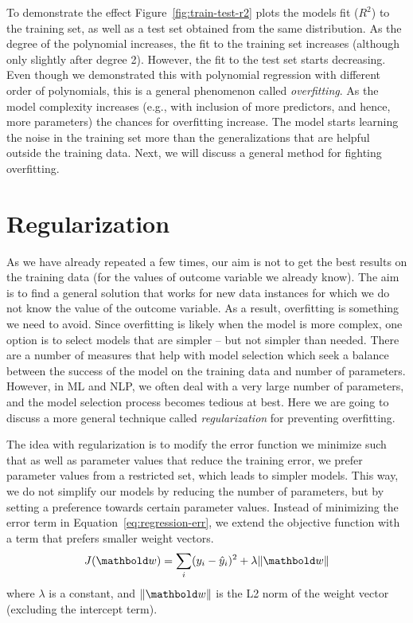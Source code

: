 To demonstrate the effect Figure~\ref{fig:train-test-r2} plots the
models fit ($R^{2}$) to the training set,
as well as a test set obtained from the same distribution.
As the degree of the polynomial increases,
the fit to the training set increases
(although only slightly after degree 2).
However, the fit to the test set starts decreasing.
Even though we demonstrated this with polynomial regression
with different order of polynomials,
this is a general phenomenon called \emph{overfitting}.
As the model complexity increases
(e.g., with inclusion of more predictors, and hence, more parameters)
the chances for overfitting increase.
The model starts learning the noise in the training set
more than the generalizations that are helpful outside the training data.
Next, we will discuss a general method for fighting overfitting.

\section{Regularization}

As we have already repeated a few times,
our aim is not to get the best results on the training data
(for the values of outcome variable we already know).
The aim is to find a general solution that works for new data instances
for which we do not know the value of the outcome variable.
As a result, overfitting is something we need to avoid.
Since overfitting is likely when the model is more complex,
one option is to select models that are simpler
-- but not simpler than needed.
There are a number of measures that help with model selection
which seek a balance between the success of the model on the training
data and number of parameters.%
However, in ML and NLP, we often deal with a very large number of parameters,
and the model selection process becomes tedious at best.
Here we are going to discuss a more general technique called
\emph{regularization} for preventing overfitting.

The idea with regularization is to modify the error function
we minimize such that
as well as parameter values that reduce the training error,
we prefer parameter values from a restricted set,
which leads to simpler models.
This way, we do not simplify our models by reducing the number of parameters,
but by setting a preference towards certain parameter values.
Instead of minimizing the error term in Equation~\ref{eq:regression-err},
we extend the objective function with a term that prefers
smaller weight vectors.
\begin{equation}\label{eq:regression-obj-l2}
  J(\vect{w}) = \sum_{i} (y_{i} - \hat{y}_{i})^{2} + \lambda \norm{\vect{w}}
\end{equation}
where $\lambda$ is a constant,
and $\norm{\vect{w}}$ is the L2 norm of the weight vector
(excluding the intercept term).

